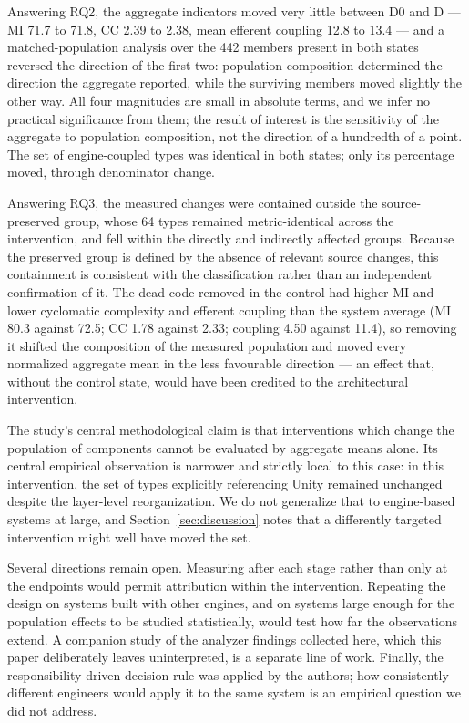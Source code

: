 \documentclass{sbc2019}%
\begin{document}
Answering RQ2, the aggregate indicators moved very little between D0 and D --- MI
71.7 to 71.8, CC 2.39 to 2.38, mean efferent coupling 12.8 to 13.4 --- and a
matched-population analysis over the 442 members present in both states reversed
the direction of the first two: population composition determined the direction
the aggregate reported, while the surviving members moved slightly the other way.
All four magnitudes are small in absolute terms, and we infer no practical
significance from them; the result of interest is the sensitivity of the
aggregate to population composition, not the direction of a hundredth of a
point. The set of engine-coupled types
was identical in both states; only its percentage moved, through denominator
change.

Answering RQ3, the measured changes were contained outside the source-preserved
group, whose 64 types remained metric-identical across the intervention, and fell
within the directly and indirectly affected groups. Because the preserved group is
defined by the absence of relevant source changes, this containment is consistent
with the classification rather than an independent confirmation of it. The dead
code removed in the control had higher MI and lower cyclomatic complexity and
efferent coupling than the system average (MI 80.3 against 72.5; CC 1.78 against
2.33; coupling 4.50 against 11.4), so removing it shifted the composition of the
measured population
and moved every normalized aggregate mean in the less favourable direction --- an
effect that, without the control state, would have been credited to the
architectural intervention.

The study's central methodological claim is that interventions which change the
population of components cannot be evaluated by aggregate means alone. Its
central empirical observation is narrower and strictly local to this case: in
this intervention, the set of types explicitly referencing Unity remained
unchanged despite the layer-level reorganization. We do not generalize that to
engine-based systems at large, and Section~\ref{sec:discussion} notes that a
differently targeted intervention might well have moved the set.

Several directions remain open. Measuring after each stage rather than only at
the endpoints would permit attribution within the intervention. Repeating the
design on systems built with other engines, and on systems large enough for the
population effects to be studied statistically, would test how far the
observations extend. A companion study of the analyzer findings collected here,
which this paper deliberately leaves uninterpreted, is a separate line of work.
Finally, the responsibility-driven decision rule was applied by the authors; how
consistently different engineers would apply it to the same system is an
empirical question we did not address.
\end{document}
